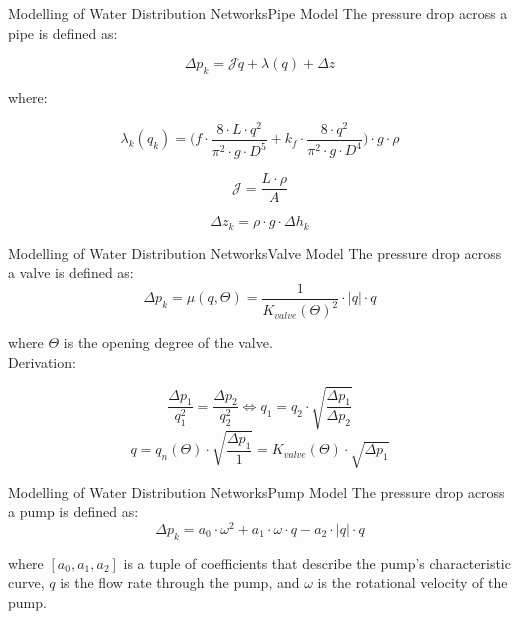 \begin{frame}{Modelling of Water Distribution Networks}{Pipe Model}
The pressure drop across a pipe is defined as:

	\begin{equation}
		\Delta{p_{k}} = \mathcal{J}\dot{q} + \lambda(q) + \Delta z
	\end{equation}

where:

	\begin{equation}
		\lambda_{k}(q_{k})  =	\Big(f \cdot \frac{8\cdot L\cdot q^{2}}{\pi^{2}\cdot g \cdot D^{5}} + k_{f}\cdot \frac{8\cdot q^{2}}{\pi^{2}\cdot g \cdot D^{4}}\Big)\cdot g \cdot \rho
	\end{equation}
	
	
	\begin{equation}
		\mathcal{J} = \frac{L\cdot \rho}{A}
	\end{equation}
	
	\begin{equation}
		\Delta{z_{k}} = \rho \cdot g \cdot \Delta{h_{k}}
	\end{equation}
\end{frame}



\begin{frame}{Modelling of Water Distribution Networks}{Valve Model}
	The pressure drop across a valve is defined as:
	\begin{equation}\label{eq:ValvePressure}
		\Delta p_{k} = \mu(q,\Theta) = \frac{1}{K_{valve}(\Theta)^2} \cdot |q|\cdot q 
	\end{equation}
	
	where $\Theta$ is the opening degree of the valve.\\
	
	Derivation:
	
	\begin{equation}\label{eq:HydrodynamicRatio}
		\frac{\Delta p_1}{q_1^2} = \frac{\Delta p_2}{q_2^2} 	\Leftrightarrow
		q_1 = q_2\cdot\sqrt{\frac{\Delta p_1}{\Delta p_2}}
	\end{equation}
\begin{equation}\label{eq:Kvalve}
	q = q_n(\Theta)\cdot\sqrt{\frac{\Delta p_1}{1}} = K_{valve}(\Theta)\cdot\sqrt{\Delta p_1}
\end{equation}
\end{frame}


\begin{frame}{Modelling of Water Distribution Networks}{Pump Model}
	The pressure drop across a pump is defined as:
	\begin{equation}\label{eq:PumpPressure}
		\Delta p_{k} =   a_0\cdot \omega^2 +  a_1\cdot \omega \cdot q -a_2\cdot |q|\cdot q
	\end{equation}
	
	where $[a_0,a_1,a_2]$ is a tuple of coefficients that describe the pump's characteristic curve, $q$ is the flow rate through the pump, and $\omega$ is the rotational velocity of the pump.
	
\end{frame}




